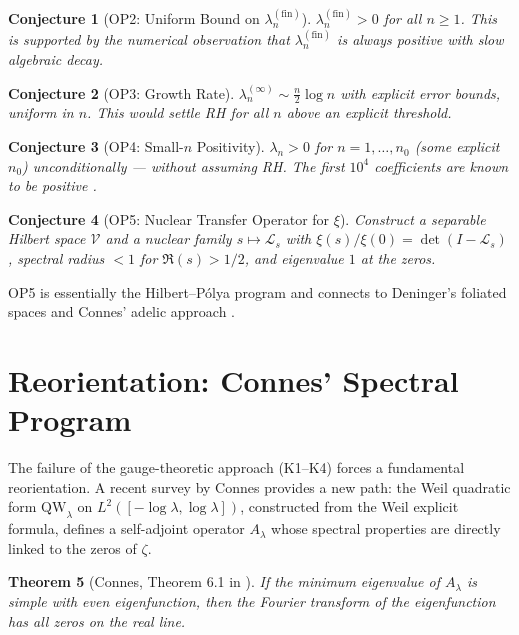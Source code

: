 \documentclass[12pt,a4paper]{article}
\newtheorem{theorem}{Theorem}[section]
\newtheorem{conjecture}[theorem]{Conjecture}
\theoremstyle{definition}
\theoremstyle{remark}
\begin{document}
\begin{conjecture}[OP2: Uniform Bound on $\lambda_n^{(\mathrm{fin})}$]
$\lambda_n^{(\mathrm{fin})} > 0$ for all $n \geq 1$. This is supported by the numerical observation that $\lambda_n^{(\mathrm{fin})}$ is always positive with slow algebraic decay.
\end{conjecture}

\begin{conjecture}[OP3: Growth Rate]
$\lambda_n^{(\infty)} \sim \frac{n}{2}\log n$ with explicit error bounds, uniform in $n$. This would settle RH for all $n$ above an explicit threshold.
\end{conjecture}

\begin{conjecture}[OP4: Small-$n$ Positivity]
$\lambda_n > 0$ for $n = 1, \ldots, n_0$ (some explicit $n_0$) unconditionally --- without assuming RH. The first $10^4$ coefficients are known to be positive \cite{Keiper1992}.
\end{conjecture}

\begin{conjecture}[OP5: Nuclear Transfer Operator for $\xi$]
Construct a separable Hilbert space $\mathcal{V}$ and a nuclear family $s \mapsto \mathcal{L}_s$ with $\xi(s)/\xi(0) = \det(I - \mathcal{L}_s)$, spectral radius $< 1$ for $\Re(s) > 1/2$, and eigenvalue $1$ at the zeros.
\end{conjecture}

OP5 is essentially the Hilbert--P\'olya program and connects to Deninger's foliated spaces \cite{Deninger2002} and Connes' adelic approach \cite{Connes1999}.


\section{Reorientation: Connes' Spectral Program}
\label{sec:reorientation}

The failure of the gauge-theoretic approach (K1--K4) forces a fundamental reorientation. A recent survey by Connes \cite{Connes2025} provides a new path: the Weil quadratic form $\mathrm{QW}_\lambda$ on $L^2([-\log\lambda, \log\lambda])$, constructed from the Weil explicit formula, defines a self-adjoint operator $A_\lambda$ whose spectral properties are directly linked to the zeros of $\zeta$.

\begin{theorem}[Connes, Theorem 6.1 in \cite{Connes2025}]
If the minimum eigenvalue of $A_\lambda$ is simple with even eigenfunction, then the Fourier transform of the eigenfunction has all zeros on the real line.
\end{theorem}
\end{document}
